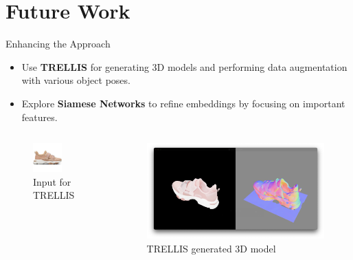 \documentclass{beamer}
\begin{document}
\section{Future Work}
\begin{frame}{Enhancing the Approach}
\begin{itemize}
    \item Use \textbf{TRELLIS} for generating 3D models and performing data augmentation with various object poses.
    \item Explore \textbf{Siamese Networks} to refine embeddings by focusing on important features.
\end{itemize}

\begin{columns}
    \begin{figure}
        \includegraphics[width=0.65\textwidth]{assets/trellis_input.png}
        \caption{Input for TRELLIS}
    \end{figure}
    \begin{figure}
        \includegraphics[width=1\textwidth]{assets/trellis_output.png}
        \caption{TRELLIS generated 3D model}
    \end{figure}
\end{columns}

\end{frame}
\end{document}
